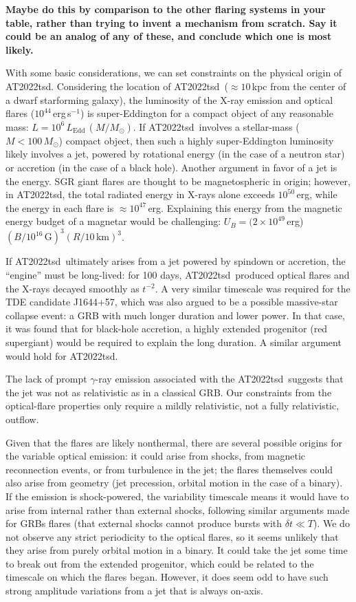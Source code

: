 \documentclass{nature_plusfigure}
\newcommand{\at}{AT2022tsd}
\begin{document}
\begin{methods}
\textbf{Maybe do this by comparison to the other flaring systems in your table, rather than trying to invent a mechanism from scratch. Say it could be an analog of any of these, and conclude which one is most likely.}

With some basic considerations, we can set constraints on the physical origin of \at.
Considering the location of \at\ ($\approx10\,$kpc from the center of a dwarf starforming galaxy),
the luminosity of the X-ray emission and optical flares ($10^{44}\,$erg\,s$^{-1}$) is super-Eddington for a compact object of any reasonable mass: $L=10^{6}\,L_\mathrm{Edd}\,(M/M_\odot)$.
If \at\ involves a stellar-mass ($M<100\,M_\odot$) compact object, then such a highly super-Eddington luminosity likely involves a jet, powered by rotational energy (in the case of a neutron star) or accretion (in the case of a black hole).
Another argument in favor of a jet is the energy. 
SGR giant flares are thought to be magnetospheric in origin; however, in \at, the total radiated energy in X-rays alone exceeds $10^{50}\,$erg, while the energy in each flare is $\approx10^{47}\,$erg. Explaining this energy from the magnetic energy budget of a magnetar would be challenging: $U_B = (2\times10^{49}\,$erg)$(B/10^{16}\,\mathrm{G})^3 (R/10\,\mathrm{km})^3$.

If \at\ ultimately arises from a jet powered by spindown or accretion, the ``engine'' must be long-lived: for 100 days, \at\ produced optical flares and the X-rays decayed smoothly as $t^{-2}$. A very similar timescale was required for the TDE candidate J1644+57, which was also argued to be a possible massive-star collapse event: a GRB with much longer duration and lower power. In that case, it was found that for black-hole accretion, a highly extended progenitor (red supergiant) would be required to explain the long duration. A similar argument would hold for \at. 

The lack of prompt $\gamma$-ray emission associated with the \at\ suggests that the jet was not as relativistic as in a classical GRB. Our constraints from the optical-flare properties only require a mildly relativistic, not a fully relativistic, outflow.

Given that the flares are likely nonthermal, there are several possible origins for the variable optical emission: it could arise from shocks, from magnetic reconnection events, or from turbulence in the jet; the flares themselves could also arise from geometry (jet precession, orbital motion in the case of a binary). If the emission is shock-powered, the variability timescale means it would have to arise from internal rather than external shocks, following similar arguments made for GRBs flares (that external shocks cannot produce bursts with $\delta t\ll T$).
We do not observe any strict periodicity to the optical flares, so it seems unlikely that they arise from purely orbital motion in a binary.
It could take the jet some time to break out from the extended progenitor, which could be related to the timescale on which the flares began.
However, it does seem odd to have such strong amplitude variations from a jet that is always on-axis.


\end{methods}
\end{document}
